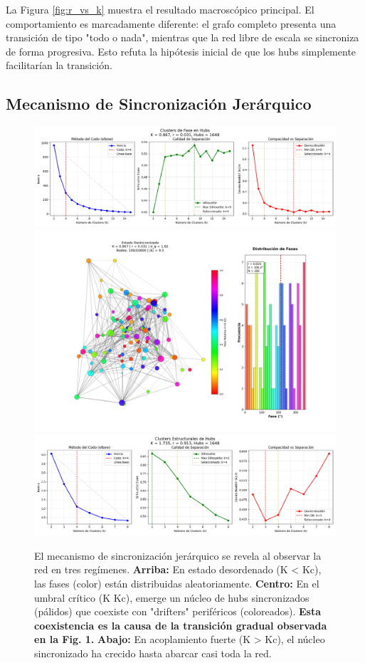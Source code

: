 \documentclass[12pt, a4paper]{article}
\begin{document}
La Figura \ref{fig:r_vs_k} muestra el resultado macroscópico principal. El comportamiento es marcadamente diferente: el grafo completo presenta una transición de tipo "todo o nada", mientras que la red libre de escala se sincroniza de forma progresiva. Esto refuta la hipótesis inicial de que los hubs simplemente facilitarían la transición.

\subsection{Mecanismo de Sincronización Jerárquico}
\begin{figure}[H]
    \centering
    \includegraphics[width=\textwidth]{img/2_1.png}
    \includegraphics[width=\textwidth]{img/2_2.png}
    \includegraphics[width=\textwidth]{img/2_3.png}
    \caption{El mecanismo de sincronización jerárquico se revela al observar la red en tres regímenes. \textbf{Arriba:} En estado desordenado (K < Kc), las fases (color) están distribuidas aleatoriamente. \textbf{Centro:} En el umbral crítico (K \approx Kc), emerge un núcleo de hubs sincronizados (pálidos) que coexiste con "drifters" periféricos (coloreados). \textbf{Esta coexistencia es la causa de la transición gradual observada en la Fig. 1.} \textbf{Abajo:} En acoplamiento fuerte (K > Kc), el núcleo sincronizado ha crecido hasta abarcar casi toda la red.}
    \label{fig:mecanismo}
\end{figure}
\end{document}
